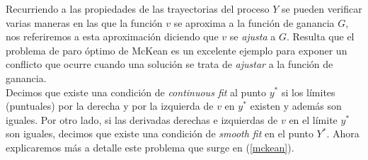 Recurriendo a las propiedades de las trayectorias del proceso $Y$ se pueden verificar varias maneras en las que la función $v$ se aproxima a la función de ganancia $G$, nos referiremos a esta aproximación diciendo que $v$ se \textit{ajusta} a $G$. Resulta que el problema de paro óptimo de McKean es un excelente ejemplo para exponer un conflicto que ocurre cuando una solución se trata de \textit{ajustar} a la función de ganancia. \\

Decimos que existe una condición de \textit{continuous fit} al punto $y^{*}$ si los límites (puntuales) por la derecha y por la izquierda de $v$ en $y^{*}$ existen y además son iguales. Por otro lado, si las derivadas derechas e izquierdas de $v$ en el límite $y^{*}$ son iguales, decimos que existe una condición de \textit{smooth fit} en el punto $Y^{*}$. Ahora explicaremos más a detalle este problema que surge en (\ref{mckean}). \\

